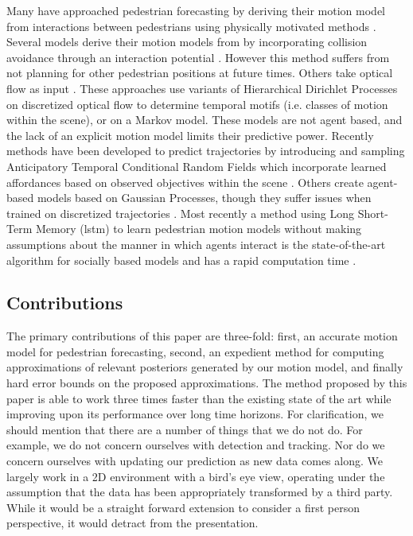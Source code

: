 \documentclass[letterpaper,10pt,conference]{ieeeconf}
\begin{document}
Many have approached pedestrian forecasting by deriving their motion model from interactions between pedestrians using physically motivated methods \cite{Helbing1995,Xu2012}. 
	Several models derive their motion models from \cite{Helbing1995} by incorporating collision avoidance through an interaction potential \cite{Pellegrini2009,Yamaguchi2011,Yi2016}. 
	However this method suffers from not planning for other pedestrian positions at future times. 
	Others take optical flow as input \cite{Hospedales2009,Wang2009,Emonet2011}.
	These approaches use variants of Hierarchical Dirichlet Processes on discretized optical flow to determine temporal motifs (i.e. classes of motion within the scene), or on a Markov model. 
	 These models are not agent based, and the lack of an explicit motion model limits their predictive power. 
	 Recently methods have been developed to predict trajectories by introducing and sampling Anticipatory Temporal Conditional Random Fields which incorporate learned affordances based on observed objectives within the scene \cite{Koppula2016}. 
	 Others create agent-based models based on Gaussian Processes, though they suffer issues when trained on discretized trajectories \cite{Tay2008,Wang2008,Trautman2015}. 
	Most recently a method using Long Short-Term Memory (lstm) to learn pedestrian motion models without making assumptions about the manner in which agents interact is the state-of-the-art algorithm for socially based models and has a rapid computation time \cite{Alahi2016}.

\subsection{Contributions}

The primary contributions of this paper are three-fold: first, an accurate motion model for pedestrian forecasting, second, an expedient method for computing approximations of relevant posteriors generated by our motion model, and finally hard error bounds on the proposed approximations.
The method proposed by this paper is able to work three times faster than the existing state of the art while improving upon its performance over long time horizons.
For clarification, we should mention that there are a number of things that we do not do.
For example, we do not concern ourselves with detection and tracking. 
Nor do we concern ourselves with updating our prediction as new data comes along.
We largely work in a 2D environment with a bird's eye view, operating under the assumption that the data has been appropriately transformed by a third party.
While it would be a straight forward extension to consider a first person perspective, it would detract from the presentation.
\end{document}
